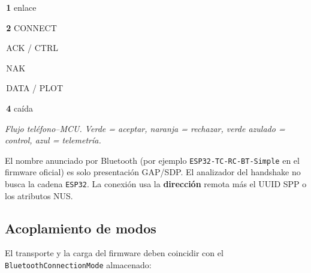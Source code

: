 \documentclass[12pt,a4paper]{article}
\newcommand{\chip}[2]{\colorbox{#1}{\strut\,\scriptsize #2\,}}
\begin{document}
\begin{center}

\vspace{0.3em}
{\sffamily\scriptsize
\chip{TblHead!18}{\textcolor{TblHead}{\textbf{1} enlace}}
\chip{TblSync}{\textbf{2} CONNECT}
\chip{TblChan}{ACK / CTRL}
\chip{TblId}{NAK}
\chip{TblTelem}{DATA / PLOT}
\chip{TblSum}{\textbf{4} ca\'ida}}

\vspace{0.15em}
{\sffamily\scriptsize\itshape
Flujo tel\'efono--MCU. Verde = aceptar, naranja = rechazar, verde azulado = control, azul = telemetr\'ia.}
\end{center}

El nombre anunciado por Bluetooth (por ejemplo
\texttt{ESP32-TC-RC-BT-Simple} en el firmware oficial) es solo presentación
GAP/SDP.
El analizador del handshake no busca la cadena \texttt{ESP32}.
La conexión usa la \textbf{dirección} remota más el UUID SPP o los
atributos NUS.

\subsection{Acoplamiento de modos}

El transporte y la carga del firmware deben coincidir con el
\texttt{BluetoothConnectionMode} almacenado:
\end{document}
